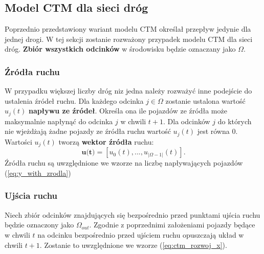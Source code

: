 \documentclass[12pt]{book}
\theoremstyle{plain}
\newcommand{\myref}[1]{(\ref{#1})}
\begin{document}
\subsection{Model CTM dla sieci dróg}
Poprzednio przedstawiony wariant modelu CTM określał przepływ jedynie dla jednej drogi. W tej sekcji zostanie rozważony przypadek modelu CTM dla sieci dróg. \textbf{Zbiór wszystkich odcinków} w środowisku będzie oznaczany jako $\Omega$. 
\subsubsection{Źródła ruchu}
W przypadku większej liczby dróg niz jedna należy rozważyć inne podejście do ustalenia źródeł ruchu. 
Dla każdego odcinka $j \in \Omega$ zostanie ustalona wartość $u_j(t)$ \textbf{napływu ze źródeł}. Określa ona ile pojazdów ze źródła może maksymalnie napłynąć do odcinka $j$ w chwili $t+1$. Dla odcinków $j$ do których nie wjeżdżają żadne pojazdy ze źródła ruchu wartość $u_j(t)$ jest równa 0. Wartości $u_j(t)$ tworzą \textbf{wektor źródła} ruchu:
\[\textbf{u(t)}=[u_0(t),...,u_{|\Omega-1|}(t)].\]
Źródła ruchu są uwzględnione we wzorze na liczbę napływających pojazdów \myref{eq:y_with_zrodla}
\subsubsection{Ujścia ruchu}
Niech zbiór odcinków znajdujących się bezpośrednio przed punktami ujścia ruchu będzie oznaczony jako $\Omega_{out}$.
Zgodnie z poprzednimi założeniami pojazdy będące w chwili $t$ na odcinku bezpośrednio przed ujściem ruchu opuszczają układ w chwili $t+1$. Zostanie to uwzględnione we wzorze \myref{eq:ctm_rozwoj_x}.
\end{document}
